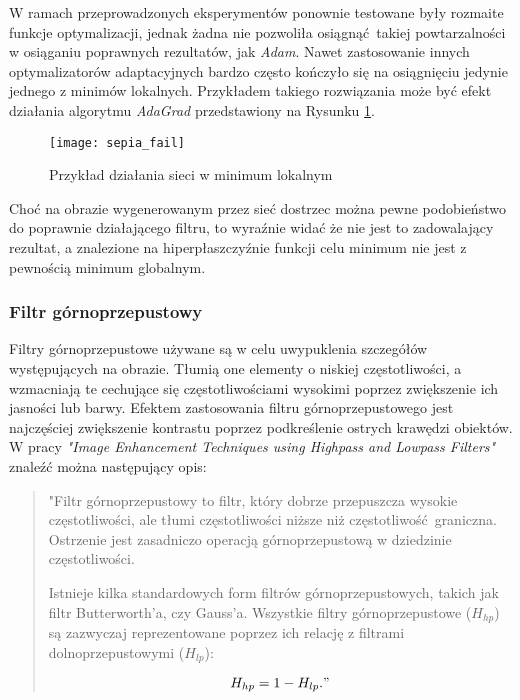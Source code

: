     W ramach przeprowadzonych eksperymentów ponownie testowane były rozmaite funkcje
    optymalizacji, jednak żadna nie pozwoliła osiągnąć takiej powtarzalności w osiąganiu
    poprawnych rezultatów, jak \textit{Adam}. Nawet zastosowanie innych optymalizatorów
    adaptacyjnych bardzo często kończyło się na osiągnięciu jedynie jednego z minimów
    lokalnych. Przykładem takiego rozwiązania może być efekt działania algorytmu
    \textit{AdaGrad} przedstawiony na Rysunku \ref{fig:sepia_fail}.

    \begin{figure}[H]
      \centering
      \texttt{[image: sepia\_fail]}
      \caption[Przykład działania sieci w minimum lokalnym - źródło: Rysunek własny]{Przykład działania sieci w minimum lokalnym}
      \label{fig:sepia_fail}
    \end{figure}

    Choć na obrazie wygenerowanym przez sieć dostrzec można pewne podobieństwo do
    poprawnie działającego filtru, to wyraźnie widać że nie jest to zadowalający
    rezultat, a znalezione na hiperpłaszczyźnie funkcji celu minimum nie jest z pewnością
    minimum globalnym.

  \subsubsection{Filtr górnoprzepustowy}

    Filtry górnoprzepustowe używane są w celu uwypuklenia szczegółów występujących na
    obrazie. Tłumią one elementy o niskiej częstotliwości, a wzmacniają te cechujące
    się częstotliwościami wysokimi poprzez zwiększenie ich jasności lub barwy.
    Efektem zastosowania filtru górnoprzepustowego jest najczęściej zwiększenie
    kontrastu poprzez podkreślenie ostrych krawędzi obiektów. W pracy
    \textit{"Image Enhancement Techniques using Highpass and
    Lowpass Filters"} \cite{highpass_filter} znaleźć można następujący opis:

    \begin{quote}
      "Filtr górnoprzepustowy to filtr, który dobrze przepuszcza wysokie częstotliwości,
      ale tłumi częstotliwości niższe niż częstotliwość graniczna. Ostrzenie jest
      zasadniczo operacją górnoprzepustową w dziedzinie częstotliwości.

      Istnieje kilka standardowych form filtrów górnoprzepustowych, takich jak
      filtr Butterworth'a, czy Gauss'a. Wszystkie filtry górnoprzepustowe ($H_{hp}$) są
      zazwyczaj reprezentowane poprzez ich relację z filtrami dolnoprzepustowymi ($H_{lp}$):

      \[H_{hp} = 1 - H_{lp}.   "\]
    \end{quote}

